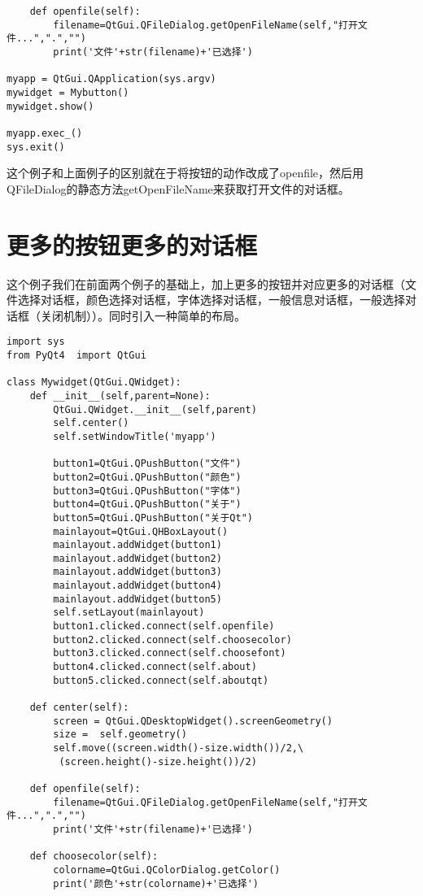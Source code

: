 \documentclass[12pt,oneside]{book}
\begin{document}
\begin{common-format}
\begin{Verbatim}
    def openfile(self):
        filename=QtGui.QFileDialog.getOpenFileName(self,"打开文件...",".","")
        print('文件'+str(filename)+'已选择')

myapp = QtGui.QApplication(sys.argv)
mywidget = Mybutton()
mywidget.show()

myapp.exec_()
sys.exit()
\end{Verbatim}
这个例子和上面例子的区别就在于将按钮的动作改成了openfile，然后用QFileDialog的静态方法getOpenFileName来获取打开文件的对话框。


\section{更多的按钮更多的对话框}
这个例子我们在前面两个例子的基础上，加上更多的按钮并对应更多的对话框（文件选择对话框，颜色选择对话框，字体选择对话框，一般信息对话框，一般选择对话框（关闭机制））。同时引入一种简单的布局。

\begin{Verbatim}
import sys
from PyQt4  import QtGui

class Mywidget(QtGui.QWidget):
    def __init__(self,parent=None):
        QtGui.QWidget.__init__(self,parent)
        self.center()
        self.setWindowTitle('myapp')

        button1=QtGui.QPushButton("文件")
        button2=QtGui.QPushButton("颜色")
        button3=QtGui.QPushButton("字体")
        button4=QtGui.QPushButton("关于")
        button5=QtGui.QPushButton("关于Qt")
        mainlayout=QtGui.QHBoxLayout()
        mainlayout.addWidget(button1)
        mainlayout.addWidget(button2)
        mainlayout.addWidget(button3)
        mainlayout.addWidget(button4)
        mainlayout.addWidget(button5)
        self.setLayout(mainlayout)
        button1.clicked.connect(self.openfile)
        button2.clicked.connect(self.choosecolor)
        button3.clicked.connect(self.choosefont)
        button4.clicked.connect(self.about)
        button5.clicked.connect(self.aboutqt)

    def center(self):
        screen = QtGui.QDesktopWidget().screenGeometry()
        size =  self.geometry()
        self.move((screen.width()-size.width())/2,\
         (screen.height()-size.height())/2)

    def openfile(self):
        filename=QtGui.QFileDialog.getOpenFileName(self,"打开文件...",".","")
        print('文件'+str(filename)+'已选择')

    def choosecolor(self):
        colorname=QtGui.QColorDialog.getColor()
        print('颜色'+str(colorname)+'已选择')


\end{Verbatim}
\end{common-format}
\end{document}
